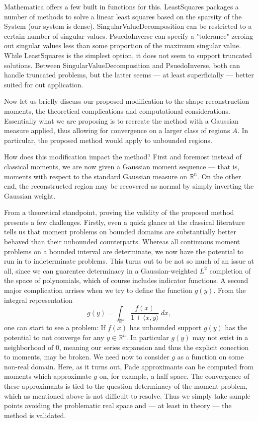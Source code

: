 \documentclass{amsart}
\theoremstyle{remark}
\numberwithin{equation}{section}
\newcommand{\RR}{\mathbb{R}}
\begin{document}
Mathematica offers a few built in functions for this. LeastSquares packages a number of methods to solve a linear least squares based on the sparsity of the System (our system is dense). SingularValueDecomposition can be restricted to a certain number of singular values. PsuedoInverse can specify a "tolerance" zeroing out singular values less than some proportion of  the maximum singular value. While LeastSquares is the simplest option, it does not seem to support truncated solutions. Between SingularValueDecomposition and PsuedoInverse, both can handle truncated problems, but the latter seems — at least superficially — better suited for out application.

Now let us briefly discuss our proposed modification to the shape reconstruction moments, the theoretical complications and computational considerations. Essentially what we are proposing is to recreate the method with a Gaussian measure applied, thus allowing for convergence on a larger class of regions $A$. In particular, the proposed method would apply to unbounded regions. 

How does this modification impact the method? First and foremost instead of classical moments, we are now given a Gaussian moment sequence — that is, moments with respect to the standard Gaussian measure on $\RR^n$. On the other end, the reconstructed region may be recovered as normal by simply inverting the Gaussian weight. 

From a theoretical standpoint, proving the validity of the proposed method presents a few challenges. Firstly, even a quick glance at the classical literature tells us that moment problems on bounded domains are substantially better behaved than their unbounded counterparts. Whereas all continuous moment problems on a bounded interval are determinate, we now have the potential to run in to indeterminate problems. This turns out to be not so much of an issue at all, since we can guarentee determinacy in a Gaussian-weighted $L^2$ completion of the space of polynomials, which of course includes indicator functions. A second major complication arrises when we try to define the function $g(y)$. From the integral representation
\[
    g(y) = \int_{\RR^n} \frac{f(x)}{1 + \langle x, y\rangle} ~dx,
\]
one can start to see a problem: If $f(x)$ has unbounded support $g(y)$ has the potential to not converge for any $y \in \RR^n$. In particular $g(y)$ may not exist in a neighborhood of $0$, meaning our series expansion and thus the explicit conection to moments, may be broken. We need now to consider $g$ as a function on some non-real domain. Here, as it turns out, Pade approximants can be computed from moments which approximate $g$ on, for example, a half space. The convergence of these approximants is tied to the question determinacy of the moment problem, which as mentioned above is not difficult to resolve. Thus we simply take sample points avoiding the problematic real space and — at least in theory — the method is validated.
\end{document}
